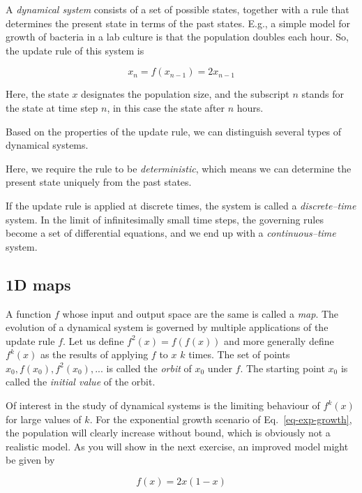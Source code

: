 A \emph{dynamical system} consists of a set of possible states, together with a rule that determines the present state in terms of the past states. E.g., a simple model for growth of bacteria in a lab culture is that the population doubles each hour. So, the update rule of this system is

\begin{equation}
x_n = f(x_{n-1}) = 2 x_{n-1} \label{eq-exp-growth}
\end{equation}

 Here, the state $x$ designates the population size, and the subscript $n$ stands for the state at time step $n$, in this case the state after $n$ hours.  

Based on the properties of the update rule, we can distinguish several types of dynamical systems.

Here, we require the rule to be \emph{deterministic}, which means we can determine the present state uniquely from the past states.

If the update rule is applied at discrete times, the system is called a \emph{discrete--time} system. In the limit of infinitesimally small time steps, the governing rules become a set of differential equations, and we end up with a \emph{continuous--time} system.

\subsection{1D maps}

A function $f$ whose input and output space are the same is called a \emph{map}. The evolution of a dynamical system is governed by multiple applications of the update rule $f$. Let us define $f^2(x)=f(f(x))$ and more generally define $f^k(x)$ as the results of applying $f$ to $x$ $k$ times. The set of points ${x_0, f(x_0), f^2(x_0), ...}$ is called the \emph{orbit} of $x_0$ under $f$. The starting point $x_0$ is called the \emph{initial value} of the orbit.

Of interest in the study of dynamical systems is the limiting behaviour of $f^k(x)$ for large values of $k$. For the exponential growth scenario of Eq.~\ref{eq-exp-growth}, the population will clearly increase without bound, which is obviously not a realistic model. As you will show in the next exercise, an improved model might be given by

\begin{equation}
f(x) = 2 x (1-x) \label{eq-logistic-growth}
\end{equation} 

